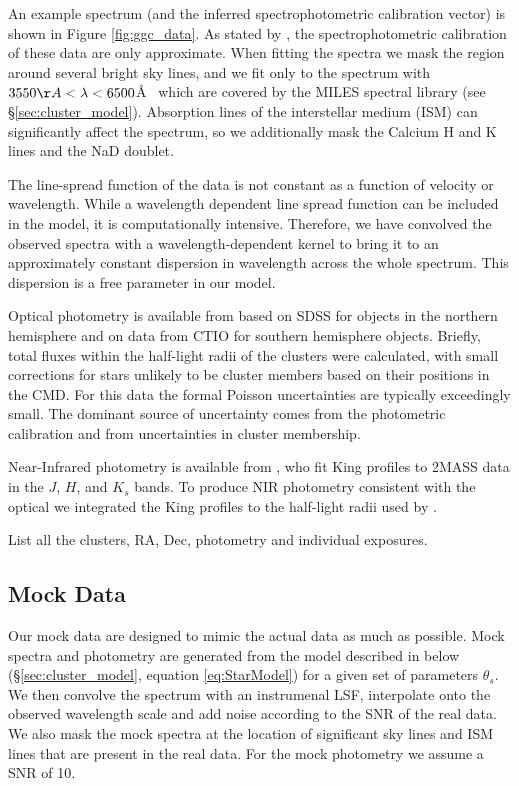 \documentclass[iop,numberedappendix]{emulateapj}
\begin{document}
An example spectrum (and the inferred spectrophotometric calibration
vector) is shown in Figure \ref{fig:ggc_data}.  As stated by
\citet{schiavon05}, the spectrophotometric calibration of these data
are only approximate.  When fitting the spectra we mask the region
around  several bright sky lines, and we fit only to the spectrum
with $3550\AA < \lambda < 6500$\AA~ which are covered by the MILES
spectral library (see \S\ref{sec:cluster_model}).  Absorption lines of
the interstellar medium (ISM) can significantly affect the spectrum,
so we additionally mask the Calcium H and K lines and the NaD doublet.

The line-spread function of the data is not constant as a function of
velocity or wavelength.  While a wavelength dependent line spread
function can be included in the model, it is computationally
intensive. Therefore, we have convolved the observed spectra with a
wavelength-dependent kernel to bring it to an approximately constant
dispersion in wavelength across the whole spectrum. This dispersion is
a free parameter in our model.

Optical photometry is available from \citep{vanderbeke14} based on
SDSS for objects in the northern hemisphere and on data from CTIO for
southern hemisphere objects.  Briefly, total fluxes within the half-light radii
of the clusters \citet{harris98} were calculated, with small
corrections for stars unlikely to be cluster members based on their
positions in the CMD. For this data the formal Poisson uncertainties
are typically exceedingly small.  The dominant source of uncertainty
comes from the photometric calibration and from uncertainties in
cluster membership.

Near-Infrared photometry is available from \citet{cohen07}, who fit
King profiles \citet{king65} to 2MASS data in the $J$, $H$, and $K_s$
bands.  To produce NIR photometry consistent with the optical we
integrated the King profiles to the half-light radii used by
\citet{vanderbeke14}.

\begin{table}[h!]
\caption{List all the clusters, RA, Dec, photometry and individual exposures.}
\end{table}


\subsection{Mock Data}
Our mock data are designed to mimic the actual data as much as
possible.  Mock spectra and photometry are generated from the model
described in below (\S\ref{sec:cluster_model}, equation
\ref{eq:StarModel}) for a given set of parameters $\theta_s$.  We then
convolve the spectrum with an instrumenal LSF, interpolate onto the
observed wavelength scale and add noise according to the SNR of the
real data.  We also mask the mock spectra at the location of
significant sky lines and ISM lines that are present in the real data.
For the mock photometry we assume a SNR of 10.
\end{document}
